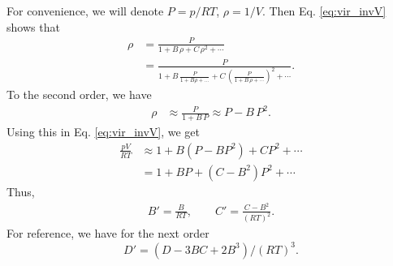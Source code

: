 \documentclass[twocolumn, 10pt]{article}
\numberwithin{equation}{section}
\newenvironment{solution}[1][\empty]
{\par\medskip\sffamily
  \textbf{\ifx\empty#1{Solution.}\relax\else{#1}\fi} \ignorespaces}
{\medskip}
\begin{document}
\begin{solution}
  For convenience, we will denote $P = p/RT$, $\rho = 1/V$.
  Then Eq. \eqref{eq:vir_invV} shows that
  \begin{align*}
    \rho
    &=
    \frac{ P } { 1 + B \, \rho + C \, \rho^2 + \cdots}
    \\
    &=
    \frac{ P } { 1 + B \, \frac{ P } { 1 + B \rho + \dots}
    + C \, \left( \frac{P}{1+B\,\rho+\cdots} \right)^2 + \cdots}
    .
  \end{align*}
  To the second order, we have
  \begin{align*}
    \rho
    &\approx
    \frac{ P } { 1 + B \, P}
    \approx
    P - B \, P^2
    .
  \end{align*}
  Using this in Eq. \eqref{eq:vir_invV}, we get
  \begin{align*}
  \frac{pV}{RT}
  &\approx
  1 + B (P - B P^2) + C P^2 + \cdots
  \\
  &=
  1 + B P + (C-B^2) P^2 + \cdots
  \end{align*}
  Thus,
  \begin{align*}
    B' = \frac{B}{RT},
    \qquad
    C' = \frac{C - B^2}{(RT)^2}.
  \end{align*}
  For reference, we have for the next order
  $$
  D' = (D -3BC+2B^3)/(RT)^3.
  $$
\end{solution}
\end{document}
